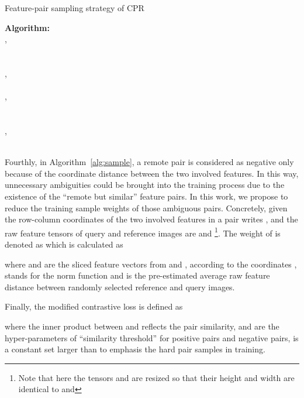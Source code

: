 \documentclass[lettersize,journal]{IEEEtran}
\begin{document}
\begin{algorithm}[ht]
  \caption{Feature-pair sampling strategy of CPR}  
    \label{alg:sample}
    \LinesNumbered  
    \textbf{Algorithm:}\\
    , \\
    \While{}
    {
        \\
        \\
        ,  \\

        \\
,  \\


        \\
        \\
        ,  \\

         \\
    }
\end{algorithm}


Fourthly, in Algorithm~\ref{alg:sample}, a remote pair is considered as negative only
because of the coordinate distance between the two involved features. In this way,
unnecessary ambiguities could be brought into the training process due to the existence of
the ``remote but similar'' feature pairs.
In this work, we propose to reduce the training sample weights of those ambiguous pairs.
Concretely, given the row-column coordinates of the two involved features in a pair
 writes ,  and the raw feature tensors
of query and reference images are  and  \footnote{Note that here the tensors 
and  are resized so that their height and width are identical to
 and }. The weight of  is
denoted as  which is calculated as

where  and  are the
sliced feature vectors from  and ,
according to the coordinates ,   stands
for the  norm function and  is the pre-estimated average raw feature distance
between randomly selected reference and query images.

Finally, the modified contrastive loss is defined as

where the inner product between  and
 reflects the pair similarity,  and
 are the hyper-parameters of ``similarity threshold'' for positive pairs and
negative pairs,  is a constant set larger than  to emphasis the hard pair samples in
training.
\end{document}

